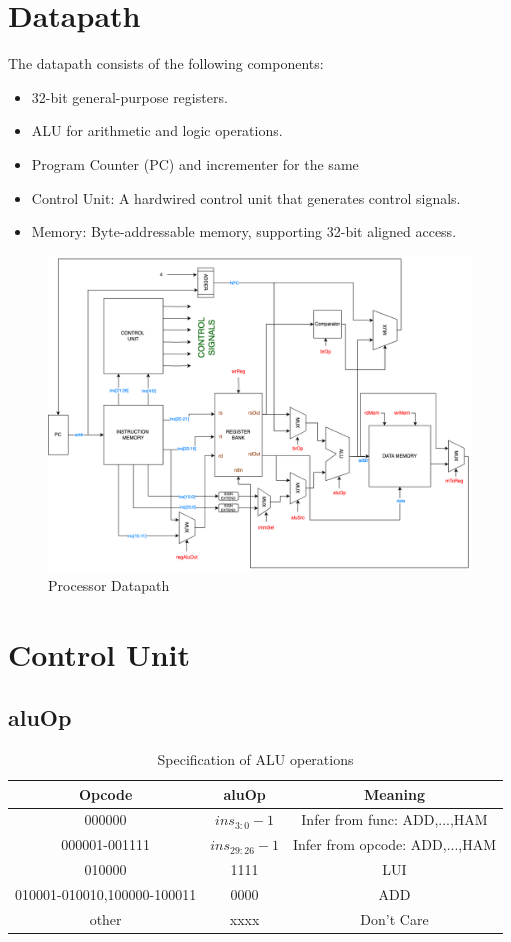 \documentclass{article}
\begin{document}
\section{Datapath}
The datapath consists of the following components:
\begin{itemize}
    \item 32-bit general-purpose registers.
    \item ALU for arithmetic and logic operations.
    \item Program Counter (PC) and incrementer for the same
    \item Control Unit: A hardwired control unit that generates control signals.
    \item Memory: Byte-addressable memory, supporting 32-bit aligned access.
\end{itemize}
\begin{figure}[H]
    \centering
    \includegraphics[width=\textwidth]{datapath.png}
    \caption{Processor Datapath}
\end{figure}

\section{Control Unit}

\subsection{aluOp}
\begin{table}[H]
    \centering
    \begin{tabular}{|c|c|c|}
        \hline
        \textbf{Opcode} & \textbf{aluOp} & \textbf{Meaning} \\
        \hline
        000000 & $ins_{3:0}-1$ & Infer from func: ADD,...,HAM \\
        000001-001111 & $ins_{29:26}-1$ & Infer from opcode: ADD,...,HAM \\
        010000 & 1111 & LUI \\
        010001-010010,100000-100011 & 0000 & ADD \\
        other & xxxx & Don't Care \\
        \hline
    \end{tabular}
    \caption{Specification of ALU operations}
\end{table}
\end{document}
